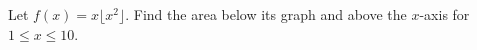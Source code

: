 Let $f(x)=x\lfloor x^2\rfloor$. Find the area below its graph and above the $x$-axis for $1\le x\le10$.
